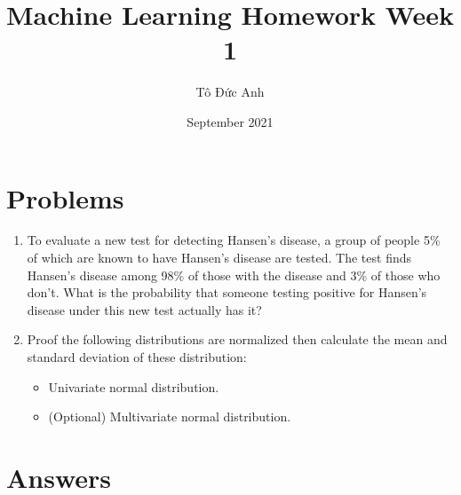 \documentclass{article}
\title{Machine Learning Homework Week 1}
\author{Tô Đức Anh}
\date{September 2021}
\begin{document}
\maketitle

\section{Problems}
    \begin{enumerate}
        \item To evaluate a new test for detecting Hansen’s disease, a group of people 5\% of which are known to have Hansen’s disease are tested. The test finds Hansen’s disease among 98\% of those with the disease and 3\% of those who don’t. What is the probability that someone testing positive for Hansen’s disease under this new test actually has it?
        
        \item Proof the following distributions are normalized then calculate the mean and standard deviation of these distribution:
        \begin{itemize}
            \item Univariate normal distribution.
            \item (Optional) Multivariate normal distribution.
        \end{itemize}
            
    \end{enumerate}

\section{Answers}
\end{document}
